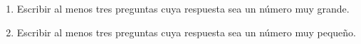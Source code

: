 \documentclass{article}
\begin{document}
\begin{enumerate}
    \item Escribir al menos tres preguntas cuya respuesta sea un número muy grande.
    
    \item Escribir al menos tres preguntas cuya respuesta sea un número muy pequeño.
\end{enumerate}
\end{document}
